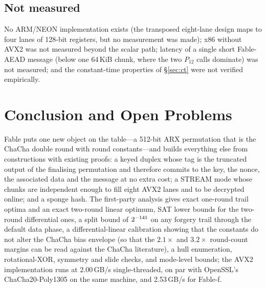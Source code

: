 \documentclass{iacrtrans}
\newcommand{\Fable}{\textsf{Fable}\xspace}
\newcommand{\FableF}{\textsf{Fable-f}\xspace}
\newcommand{\FableAEAD}{\textsf{Fable-AEAD}\xspace}
\newcommand{\ChaCha}{\textsf{ChaCha}\xspace}
\newcommand{\PP}[1]{P_{#1}}
\newcommand{\WrateTwo}{42}   %
\newcommand{\WuncTwo}{33}    %
\newcommand{\BoundEight}{\the\numexpr\WrateTwo+3*\WuncTwo\relax}   %
\begin{document}
\subsection{Not measured}
\label{sec:notmeasured}
No ARM/NEON implementation exists (the transposed eight-lane design maps to four lanes of 128-bit registers, but no measurement was made); x86 without AVX2 was not measured beyond the scalar path; latency of a single short \FableAEAD message (below one 64\,KiB chunk, where the two $\PP{12}$ calls dominate) was not measured; and the constant-time properties of \S\ref{sec:ct} were not verified empirically.

\section{Conclusion and Open Problems}
\label{sec:conclusion}

\Fable puts one new object on the table---a 512-bit ARX permutation that is the \ChaCha double round with round constants---and builds everything else from constructions with existing proofs: a keyed duplex whose tag is the truncated output of the finalising permutation and therefore commits to the key, the nonce, the associated data and the message at no extra cost; a STREAM mode whose chunks are independent enough to fill eight AVX2 lanes and to be decrypted online; and a sponge hash. The first-party analysis gives exact one-round trail optima and an exact two-round linear optimum, SAT lower bounds for the two-round differential ones, a split bound of $2^{-\BoundEight}$ on any forgery trail through the default data phase, a differential-linear calibration showing that the constants do not alter the \ChaCha bias envelope (so that the $2.1\times$ and $3.2\times$ round-count margins can be read against the \ChaCha literature), a hull enumeration, rotational-XOR, symmetry and slide checks, and mode-level bounds; the AVX2 implementation runs at 2.00\,GB/s single-threaded, on par with OpenSSL's ChaCha20-Poly1305 on the same machine, and 2.53\,GB/s for \FableF.
\end{document}
